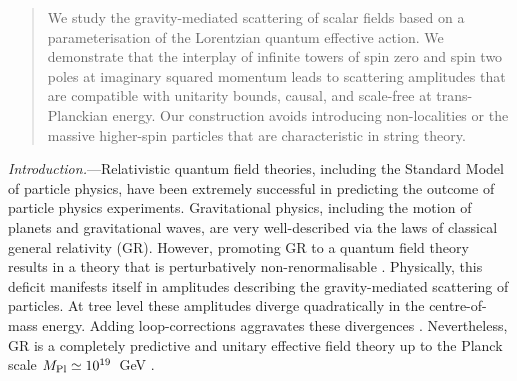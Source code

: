 \documentclass[aps,prl,reprint,twocolumn,superscriptaddress,longbibliography,nofootinbib,floatfix,showpacs]{revtex4-1}
\newcommand{\GR}{{\small GR}}
\begin{document}
\begin{abstract}
We study the gravity-mediated scattering of scalar fields based on a parameterisation of the Lorentzian quantum effective action. We demonstrate that the interplay of infinite towers of spin zero and spin two poles at imaginary squared momentum leads to scattering amplitudes that are compatible with unitarity bounds, causal, and scale-free at trans-Planckian energy. Our construction avoids introducing non-localities or the massive higher-spin particles that are characteristic in string theory. 
\end{abstract}
%

%
\maketitle


\textit{Introduction.}---Relativistic quantum field theories, including the Standard Model of particle physics, have been extremely successful in predicting the outcome of particle physics experiments.
Gravitational physics, including the motion of planets and gravitational waves, are very well-described via the laws of classical general relativity (\GR{}).
However, promoting \GR{} to a quantum field theory results in a theory that is perturbatively non-renormalisable \cite{'tHooft:1974bx, Goroff:1985sz, Goroff:1985th}.
Physically, this deficit manifests itself in amplitudes describing the gravity-mediated scattering of particles.
At tree level these amplitudes diverge quadratically in the centre-of-mass energy.
Adding loop-corrections aggravates these divergences \cite{Anber:2011ut}.
Nevertheless, \GR{} is a completely predictive and unitary effective field theory up to the Planck scale $M_{\rm Pl} \simeq 10^{19}$~GeV \cite{Donoghue:1993eb, Donoghue:1994dn,Aydemir:2012nz}.
\end{document}
